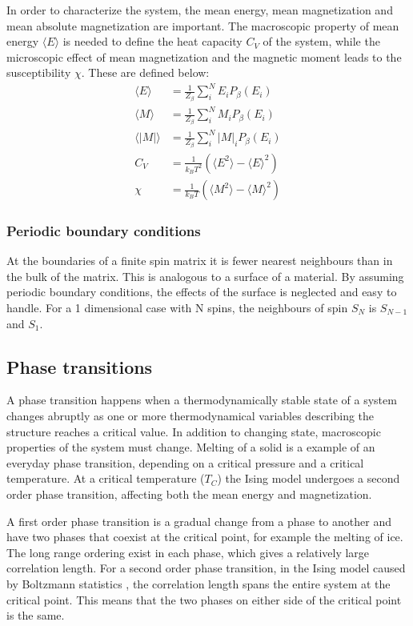In order to characterize the system, the mean energy, mean magnetization and mean absolute magnetization are important. The macroscopic property of mean energy $ \langle E \rangle $ is needed to define the heat capacity $ C_V$ of the system, while the microscopic effect of mean magnetization and the magnetic moment leads to the susceptibility $ \chi $. These are defined below: 
\begin{align}
\langle E \rangle &= \frac{1}{Z_{\beta}} \sum\limits_{i}^N E_i P_{\beta}(E_i)\\
\langle M \rangle &= \frac{1}{Z_{\beta}} \sum\limits_{i}^N M_i P_{\beta}(E_i)\\
\langle |M | \rangle &= \frac{1}{Z_{\beta}} \sum\limits_{i}^N |M|_i P_{\beta}(E_i)\\
 C_V &= \frac{1}{k_B T^2} \left( 	\langle E^2 \rangle - \langle E\rangle^2 	\right) \label{eq_C_V_def}\\
\chi &= \frac{1}{k_B T} \left( 	\langle M^2 \rangle - \langle M\rangle^2 	\right)\label{eq_X_def}
\end{align}


\subsubsection{Periodic boundary conditions}

At the boundaries of a finite spin matrix it is fewer nearest neighbours than in the bulk of the matrix. This is analogous to a surface of a material. By assuming periodic boundary conditions, the effects of the surface is neglected and easy to handle. For a 1 dimensional case with N spins, the neighbours of spin $ S_N $ is $ S_{N-1} $ and $ S_1 $. 

\subsection{Phase transitions}

A phase transition happens when a thermodynamically stable state of a system changes abruptly as one or more thermodynamical  variables describing the structure reaches a critical value. In addition to changing state, macroscopic properties of the system must change. Melting of a solid is a example of an everyday phase transition, depending on a critical pressure and a critical temperature. At a critical temperature ($ T_C $) the Ising model undergoes a second order phase transition, affecting both the mean energy and magnetization. 


A first order phase transition is a gradual change from a phase to another and have two phases that coexist at the critical point, for example the melting of ice. The long range ordering exist in each phase, which gives a relatively large correlation length. For a second order phase transition, in the Ising model caused by  Boltzmann statistics , the correlation length spans the entire system at the critical point. This means that the two phases on either side of the critical point is the same. 

